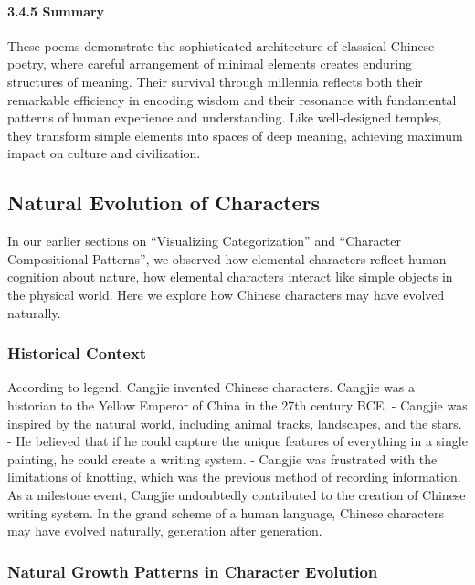 \documentclass[
  11pt,
  letterpaper,
]{article}
\begin{document}
\paragraph{3.4.5 Summary}\label{summary}

These poems demonstrate the sophisticated architecture of classical
Chinese poetry, where careful arrangement of minimal elements creates
enduring structures of meaning. Their survival through millennia
reflects both their remarkable efficiency in encoding wisdom and their
resonance with fundamental patterns of human experience and
understanding. Like well-designed temples, they transform simple
elements into spaces of deep meaning, achieving maximum impact on
culture and civilization.

\subsection{Natural Evolution of
Characters}\label{natural-evolution-of-characters}

In our earlier sections on ``Visualizing Categorization'' and
``Character Compositional Patterns'', we observed how elemental
characters reflect human cognition about nature, how elemental
characters interact like simple objects in the physical world. Here we
explore how Chinese characters may have evolved naturally.

\subsubsection{Historical Context}\label{historical-context}

According to legend, Cangjie invented Chinese characters. Cangjie was a
historian to the Yellow Emperor of China in the 27th century BCE. -
Cangjie was inspired by the natural world, including animal tracks,
landscapes, and the stars. - He believed that if he could capture the
unique features of everything in a single painting, he could create a
writing system. - Cangjie was frustrated with the limitations of
knotting, which was the previous method of recording information. As a
milestone event, Cangjie undoubtedly contributed to the creation of
Chinese writing system. In the grand scheme of a human language, Chinese
characters may have evolved naturally, generation after generation.

\subsubsection{Natural Growth Patterns in Character
Evolution}\label{natural-growth-patterns-in-character-evolution}
\end{document}
